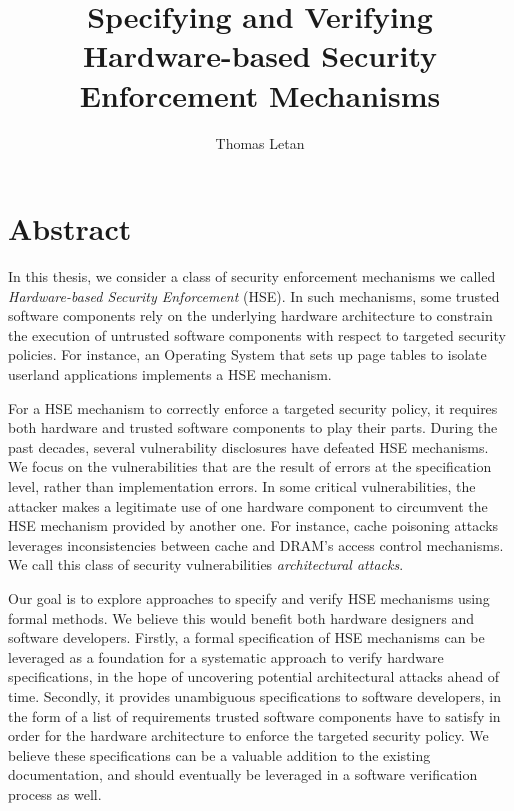 \documentclass{article}
\title{Specifying and Verifying Hardware-based Security Enforcement Mechanisms}
\author{Thomas Letan}
\date{}
\begin{document}
\maketitle

\section{Abstract}

In this thesis, we consider a class of security enforcement mechanisms we called
\emph{Hardware-based Security Enforcement} (HSE).
%
In such mechanisms, some trusted software components rely on the underlying
hardware architecture to constrain the execution of untrusted software
components with respect to targeted security policies.
%
For instance, an Operating System that sets up page tables to isolate userland
applications implements a HSE mechanism.

For a HSE mechanism to correctly enforce a targeted security policy, it requires
both hardware and trusted software components to play their parts.
%
During the past decades, several vulnerability disclosures have defeated HSE
mechanisms.
%
We focus on the vulnerabilities that are the result of errors at the
specification level, rather than implementation errors.
%
In some critical vulnerabilities, the attacker makes a legitimate use of one
hardware component to circumvent the HSE mechanism provided by another one.
%
For instance, cache poisoning attacks leverages inconsistencies between cache
and DRAM's access control mechanisms.
%
We call this class of security vulnerabilities \emph{architectural attacks}.

Our goal is to explore approaches to specify and verify HSE mechanisms using
formal methods.
%
We believe this would benefit both hardware designers and software developers.
%
Firstly, a formal specification of HSE mechanisms can be leveraged as a
foundation for a systematic approach to verify hardware specifications, in the
hope of uncovering potential architectural attacks ahead of time.
%
Secondly, it provides unambiguous specifications to software developers, in the
form of a list of requirements trusted software components have to satisfy in
order for the hardware architecture to enforce the targeted security policy.
%
We believe these specifications can be a valuable addition to the existing
documentation, and should eventually be leveraged in a software verification
process as well.
%
\end{document}
